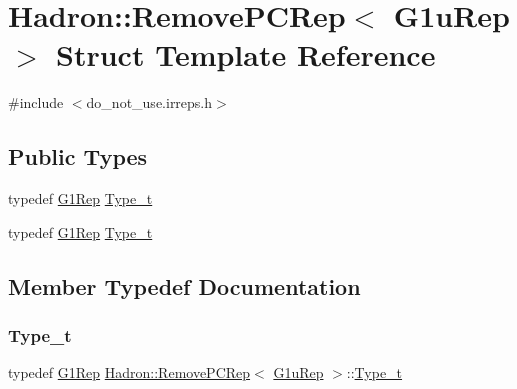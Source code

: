 \hypertarget{structHadron_1_1RemovePCRep_3_01G1uRep_01_4}{}\section{Hadron\+:\+:Remove\+P\+C\+Rep$<$ G1u\+Rep $>$ Struct Template Reference}
\label{structHadron_1_1RemovePCRep_3_01G1uRep_01_4}


{\ttfamily \#include $<$do\+\_\+not\+\_\+use.\+irreps.\+h$>$}

\subsection*{Public Types}
\begin{DoxyCompactItemize}
\item 
typedef \mbox{\hyperlink{structHadron_1_1G1Rep}{G1\+Rep}} \mbox{\hyperlink{structHadron_1_1RemovePCRep_3_01G1uRep_01_4_ad0b4cb2571a6aad91f0bd3daf9ac4df1}{Type\+\_\+t}}
\item 
typedef \mbox{\hyperlink{structHadron_1_1G1Rep}{G1\+Rep}} \mbox{\hyperlink{structHadron_1_1RemovePCRep_3_01G1uRep_01_4_ad0b4cb2571a6aad91f0bd3daf9ac4df1}{Type\+\_\+t}}
\end{DoxyCompactItemize}


\subsection{Member Typedef Documentation}
\mbox{\label{structHadron_1_1RemovePCRep_3_01G1uRep_01_4_ad0b4cb2571a6aad91f0bd3daf9ac4df1}} 
\subsubsection{\texorpdfstring{Type\_t}{Type\_t}\hspace{0.1cm}{\footnotesize\ttfamily [1/2]}}
{\footnotesize\ttfamily typedef \mbox{\hyperlink{structHadron_1_1G1Rep}{G1\+Rep}} \mbox{\hyperlink{structHadron_1_1RemovePCRep}{Hadron\+::\+Remove\+P\+C\+Rep}}$<$ \mbox{\hyperlink{structHadron_1_1G1uRep}{G1u\+Rep}} $>$\+::\mbox{\hyperlink{structHadron_1_1RemovePCRep_3_01G1uRep_01_4_ad0b4cb2571a6aad91f0bd3daf9ac4df1}{Type\+\_\+t}}}

